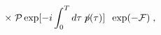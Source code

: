 \begin{equation}\label{eq:g2}
\times \; {\mathcal P} \exp[ -i \int_0^T d\tau \, {\not \! p}(\tau) ] 
\;\; \exp( -{\mathcal F}) \;,
\end{equation}

